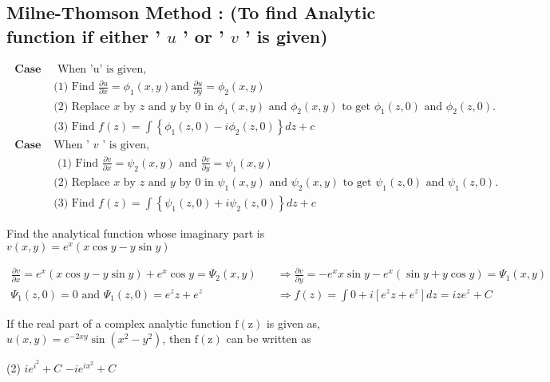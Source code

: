 \begin{note}
	\subsection{Milne-Thomson Method : (To find Analytic function if either ' $u$ ' or ' $v$ ' is given)}
	\begin{align*}
\textbf{	Case 1:}&\text{ When 'u' is given,}\\
	&\text{(1) Find }\frac{\partial u}{\partial x}=\phi_{1}(x, y) \text{and }\frac{\partial u}{\partial y}=\phi_{2}(x, y)\\
	&\text{(2) Replace }\text{$x$ by $z$ and $y$ by 0 in $\phi_{1}(x, y)$ and $\phi_{2}(x, y)$ to get $\phi_{1}(z, 0)$ and $\phi_{2}(z, 0)$.}\\
	&\text{(3) Find }f(z)=\int\left\{\phi_{1}(z, 0)-i \phi_{2}(z, 0)\right\} d z+c\\
\textbf{	Case 2: }&\text{When ' $v$ ' is given,}\\
&\text{	(1) Find }\frac{\partial v}{\partial x}=\psi_{2}(x, y)\text{ and }\frac{\partial v}{\partial y}=\psi_{1}(x, y)\\
&\text{(2) Replace }\text{$x$ by $z$ and $y$ by 0 in $\psi_{1}(x, y)$ and $\psi_{2}(x, y)$ to get $\psi_{1}(z, 0)$ and $\psi_{1}(z, 0)$.}\\
&\text{(3) Find }f(z)=\int\left\{\psi_{1}(z, 0)+i \psi_{2}(z, 0)\right\} d z+c
	\end{align*}
	\begin{exercise}
		Find the analytical function whose imaginary part is $v(x, y)=e^{x}(x \cos y-y \sin y)$
	\end{exercise}
	\begin{answer}
		\begin{align*}
		\frac{\partial v}{\partial x}=e^{x}(x \cos y-y \sin y)+e^{x} \cos y=\Psi_{2}(x, y) \quad& \Rightarrow \frac{\partial v}{\partial y}=-e^{x} x \sin y-e^{x}(\sin y+y \cos y)=\Psi_{1}(x, y) \\
		\Psi_{1}(z, 0)=0 \text { and } \Psi_{1}(z, 0)=e^{z} z+e^{z} \quad& \Rightarrow f(z)=\int 0+i\left[e^{z} z+e^{z}\right] d z=i z e^{z}+C
		\end{align*}
	\end{answer}
	\begin{exercise}
		 If the real part of a complex analytic function $\mathrm{f}(\mathrm{z})$ is given as, $u(x, y)=e^{-2 x y} \sin \left(x^{2}-y^{2}\right)$, then $\mathrm{f}(\mathrm{z})$ can be written as
		 \begin{tasks}(2)
			\task[\textbf{a.}]$i e^{i^{2}}+C$
			\task[\textbf{b.}] $-i e^{i x^{2}}+C$

\end{tasks}
\end{exercise}
\end{note}
